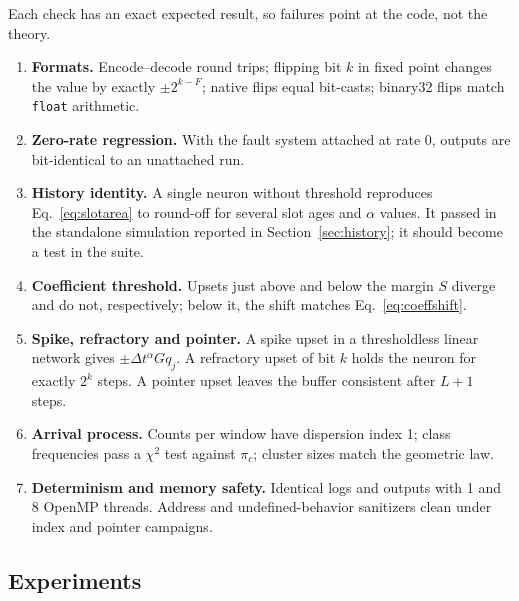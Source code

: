 \documentclass[11pt,a4paper]{article}
\newcommand{\dta}{\Delta t^{\alpha}}
\begin{document}
Each check has an exact expected result, so failures point at the code, not the theory.
\begin{enumerate}
  \item \textbf{Formats.} Encode--decode round trips; flipping bit $k$ in fixed point changes the value by exactly $\pm2^{k-F}$; native flips equal bit-casts; binary32 flips match \texttt{float} arithmetic.
  \item \textbf{Zero-rate regression.} With the fault system attached at rate 0, outputs are bit-identical to an unattached run.
  \item \textbf{History identity.} A single neuron without threshold reproduces Eq.~\eqref{eq:slotarea} to round-off for several slot ages and $\alpha$ values. It passed in the standalone simulation reported in Section~\ref{sec:history}; it should become a test in the suite.
  \item \textbf{Coefficient threshold.} Upsets just above and below the margin $S$ diverge and do not, respectively; below it, the shift matches Eq.~\eqref{eq:coeffshift}.
  \item \textbf{Spike, refractory and pointer.} A spike upset in a thresholdless linear network gives $\pm\dta G q_j$. A refractory upset of bit $k$ holds the neuron for exactly $2^{k}$ steps. A pointer upset leaves the buffer consistent after $L+1$ steps.
  \item \textbf{Arrival process.} Counts per window have dispersion index 1; class frequencies pass a $\chi^2$ test against $\pi_c$; cluster sizes match the geometric law.
  \item \textbf{Determinism and memory safety.} Identical logs and outputs with 1 and 8 OpenMP threads. Address and undefined-behavior sanitizers clean under index and pointer campaigns.
\end{enumerate}

\subsection{Experiments}
\end{document}
